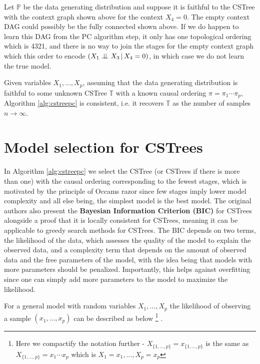 \documentclass{tufte-book}
\begin{document}
Let \(\mathbb{P}\) be the data generating distribution and suppose it is faithful to the CSTree with the context graph shown above for the context \(X_4=0\). The empty context DAG could possibly be the fully connected shown above. If we do happen to learn this DAG from the PC algorithm step, it only has one topological ordering which is 4321, and there is no way to join the stages for the empty context graph which this order to encode \((X_1 \perp \!\!\! \perp X_3 \,|\,X_4=0)\), in which case we do not learn the true model.


\begin{theorem}\label{thm:cstreepccorrectness}
Given variables $X_1,...,X_p$, assuming that the data generating distribution is faithful to some unknown CSTree $\mathbb{T}$ with a known causal ordering $\pi = \pi_1 \cdots \pi_p$, Algorithm \ref{alg:cstreepc} is consistent, i.e. it recovers $\mathbb{T}$ as the number of samples $n \rightarrow \infty$.
\end{theorem}


\section{Model selection for CSTrees}
\label{sec:org8f6f51a}
In Algorithm \ref{alg:cstreepc} we select the CSTree (or CSTrees if there is more than one) with the causal ordering corresponding to the fewest stages, which is motivated by the principle of Occams razor since few stages imply lower model complexity and all else being, the simplest model is the best model. The original authors also present the \textbf{Bayesian Information Criterion (BIC)} for CSTrees alongside a proof that it is locally consistent for CSTrees, meaning it can be applicable to greedy search methods for CSTrees. The BIC depends on two terms, the likelihood of the data, which assesses the quality of the model to explain the observed data, and a complexity term that depends on the amount of observed data and the free parameters of the model, with the idea being that models with more parameters should be penalized. Importantly, this helps against overfitting since one can simply add more parameters to the model to maximize the likelihood.


For a general model with random variables \(X_1,...,X_p\) the likelihood of observing a sample \((x_1,...,x_p)\) can be described as below  \footnote{Here we compactify the notation further - $X_{\{1,...,p\}}=x_{\{1,...,p\}}$ is the same as $X_{\{1,...,p\}}=x_1\cdots x_p$ which is $X_1=x_1,...,X_p=x_p$} 
.
\end{document}
